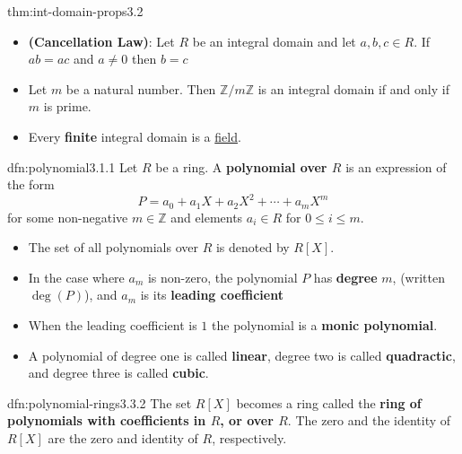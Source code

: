 \documentclass[landscape, 8pt]{extarticle}
\begin{document}
\begin{multicols}{3}
\begin{thm}{thm:int-domain-props}{3.2}
    \begin{itemize}
        \setlength\itemsep{0em}
        \item[\textbf{3.2.15}] \textbf{(Cancellation Law)}: Let $R$ be an integral domain and let $a,b,c\in R$. If $ab = ac$ and $a\ne 0$ then $b = c$
        \item[\textbf{3.2.16}] Let $m$ be a natural number. Then $\mathbb{Z} / m\mathbb{Z}$ is an integral domain if and only if $m$ is prime.
        \item[\textbf{3.2.17}] Every \textbf{finite} integral domain is a \hyperref[dfn:fields-and-rings]{field}.
    \end{itemize}
    
    
\end{thm}

\begin{dfn}[Polynomial]{dfn:polynomial}{3.1.1}
    Let $R$ be a ring. A \textbf{polynomial over $R$} is an expression of the form
    \[P = a_{0} + a_{1}X + a_{2}X^{2} + \cdots + a_{m}X^{m}\]
    for some non-negative $m\in \mathbb{Z}$ and elements $a_{i}\in R$ for $0 \le i \le m$. 

    \vspace{-5pt}
    \begin{itemize}[leftmargin=*]
        \setlength\itemsep{0em}
        \item The set of all polynomials over $R$ is denoted by $R[X]$.
        \item In the case where $a_{m}$ is non-zero, the polynomial $P$ has \textbf{degree} $m$, (written $\deg(P)$), and $a_{m}$ is its \textbf{leading coefficient}
        \item When the leading coefficient is $1$ the polynomial is a \textbf{monic polynomial}.
        \item A polynomial of degree one is called \textbf{linear}, degree two is called \textbf{quadractic}, and degree three is called \textbf{cubic}.
    \end{itemize}
\end{dfn}

\begin{dfn}{dfn:polynomial-rings}{3.3.2}
    The set $R[X]$ becomes a ring called the \textbf{ring of polynomials with coefficients in $R$, or over $R$}. The zero and the identity of $R[X]$ are the zero and identity of $R$, respectively.
\end{dfn}


\end{multicols}
\end{document}
